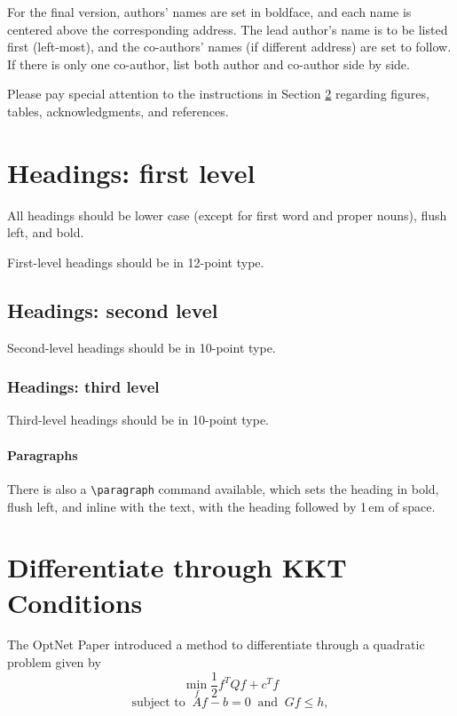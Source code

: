 \documentclass{article}
\begin{document}
For the final version, authors' names are set in boldface, and each
name is centered above the corresponding address. The lead author's
name is to be listed first (left-most), and the co-authors' names (if
different address) are set to follow. If there is only one co-author,
list both author and co-author side by side.

Please pay special attention to the instructions in Section \ref{others}
regarding figures, tables, acknowledgments, and references.

\section{Headings: first level}
\label{headings}

All headings should be lower case (except for first word and proper
nouns), flush left, and bold.

First-level headings should be in 12-point type.

\subsection{Headings: second level}

Second-level headings should be in 10-point type.

\subsubsection{Headings: third level}

Third-level headings should be in 10-point type.

\paragraph{Paragraphs}

There is also a \verb+\paragraph+ command available, which sets the
heading in bold, flush left, and inline with the text, with the
heading followed by 1\,em of space.

\section{Differentiate through KKT Conditions}
\label{others}

The OptNet Paper introduced a method to differentiate through a quadratic problem given by
\[ \min_f \frac{1}{2} f^T Q f + c^T f \]
\[\text{subject to }~  Af-b=0 ~\text{ and }~ Gf \leq h, \]
\end{document}
